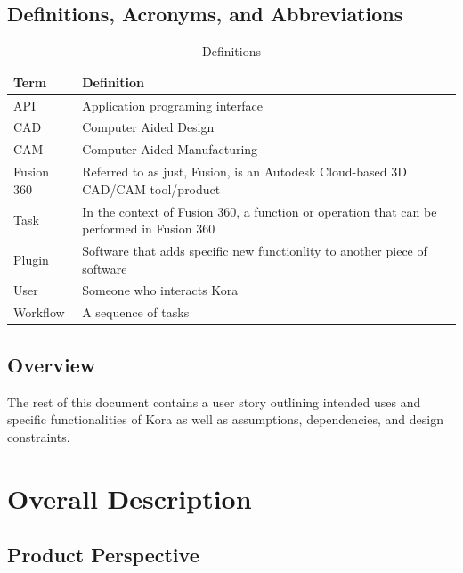 \documentclass[onecolumn, draftclsnofoot,10pt, compsoc]{IEEEtran}
\def \botname{Kora }
\begin{document}
    \subsection{Definitions, Acronyms, and Abbreviations}
        \begin{table}[h]
            \centering
            \caption{Definitions}
            \label{my-label}
            \begin{tabular}{|l|l|}
                \hline
                \textbf{Term} & \textbf{Definition} \\ \hline
                API & Application programing interface \\ \hline
                CAD & Computer Aided Design \\ \hline
                CAM & Computer Aided Manufacturing \\ \hline
                Fusion 360 & 
                Referred to as just, Fusion, is an Autodesk Cloud-based 3D CAD/CAM tool/product \\ \hline
                Task & In the context of Fusion 360, a function or operation that can be performed in Fusion 360 \\ \hline
                Plugin & Software that adds specific new functionlity to another piece of software \\ \hline
                User & Someone who interacts \botname  \\ \hline
                Workflow & A sequence of tasks \\ \hline
            \end{tabular}
        \end{table}
    \subsection{Overview}
        The rest of this document contains a user story outlining intended uses and specific functionalities of \botname as well as assumptions, dependencies, and design constraints. 

\section{Overall Description}
    \subsection{Product Perspective}
\end{document}
